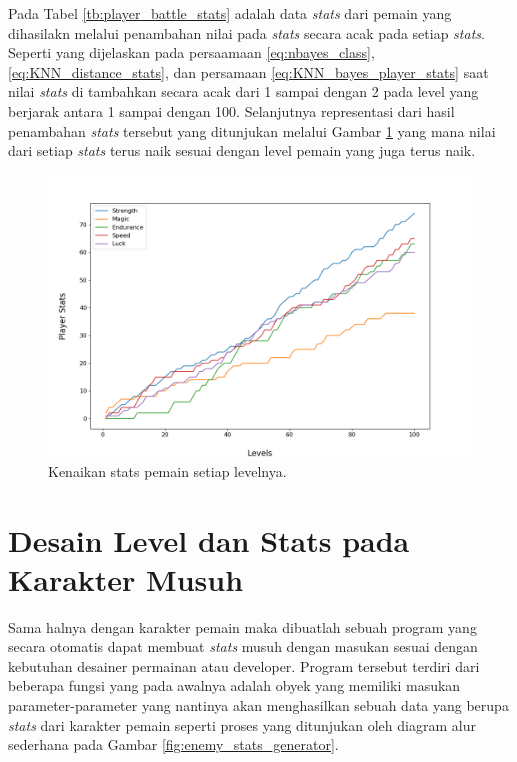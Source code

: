 Pada Tabel \ref{tb:player_battle_stats} adalah data \textit{stats} dari pemain yang dihasilakn melalui penambahan nilai pada \textit{stats} secara acak pada setiap \textit{stats}. Seperti yang dijelaskan pada persaamaan \ref{eq:nbayes_class}, \ref{eq:KNN_distance_stats}, dan persamaan \ref{eq:KNN_bayes_player_stats} saat nilai \textit{stats} di tambahkan secara acak dari 1 sampai dengan 2 pada level yang berjarak antara 1 sampai dengan 100. Selanjutnya representasi dari hasil penambahan \textit{stats} tersebut yang ditunjukan melalui Gambar \ref{fig:stats_player} yang mana nilai dari setiap \textit{stats} terus naik sesuai dengan level pemain yang juga terus naik. 
\vspace{1ex}

\begin{figure} [!h] \centering
	\includegraphics[scale=0.5]{img/PlayerStatsDistrib.png}
	\caption{Kenaikan stats pemain setiap levelnya.}
	\label{fig:stats_player}
\end{figure}
\vspace{1ex}

\section{Desain Level dan Stats pada Karakter Musuh}
\label{sec:sec3_enemy_stats}
\vspace{1ex}

Sama halnya dengan karakter pemain maka dibuatlah sebuah program yang secara otomatis dapat membuat \textit{stats} musuh dengan masukan sesuai dengan kebutuhan desainer permainan atau developer. Program tersebut terdiri dari beberapa fungsi yang pada awalnya adalah obyek yang memiliki masukan parameter-parameter yang nantinya akan menghasilkan sebuah data yang berupa \textit{stats} dari karakter pemain seperti proses yang ditunjukan oleh diagram alur sederhana pada Gambar \ref{fig:enemy_stats_generator}.
\vspace{1ex}

